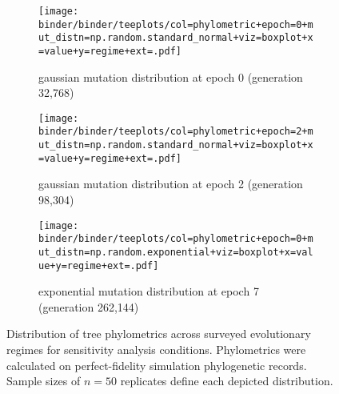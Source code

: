 \begin{figure*}
  \centering
  \begin{subfigure}[b]{\textwidth}
    \centering
    \texttt{[image: binder/binder/teeplots/col=phylometric+epoch=0+mut\_distn=np.random.standard\_normal+viz=boxplot+x=value+y=regime+ext=.pdf]}
    \caption{%
      gaussian mutation distribution at epoch 0 (generation 32,768)}
    \label{fig:perfect-tree-phylometrics-sensitivity-analysis:epoch0}
  \end{subfigure}
  \begin{subfigure}[b]{\textwidth}
    \centering
    \texttt{[image: binder/binder/teeplots/col=phylometric+epoch=2+mut\_distn=np.random.standard\_normal+viz=boxplot+x=value+y=regime+ext=.pdf]}
    \caption{%
      gaussian mutation distribution at epoch 2 (generation 98,304)}
    \label{fig:perfect-tree-phylometrics-sensitivity-analysis:epoch2}
  \end{subfigure}
  \begin{subfigure}[b]{\textwidth}
    \centering
    \texttt{[image: binder/binder/teeplots/col=phylometric+epoch=0+mut\_distn=np.random.exponential+viz=boxplot+x=value+y=regime+ext=.pdf]}
    \caption{%
      exponential mutation distribution at epoch 7 (generation 262,144)}
    \label{fig:perfect-tree-phylometrics-sensitivity-analysis:exponential}
  \end{subfigure}
  \caption{
    Distribution of tree phylometrics across surveyed evolutionary regimes for sensitivity analysis conditions.
    Phylometrics were calculated on perfect-fidelity simulation phylogenetic records.
    Sample sizes of $n=50$ replicates define each depicted distribution.
  }
  \label{fig:perfect-tree-phylometrics-sensitivity-analysis}
\end{figure*}
